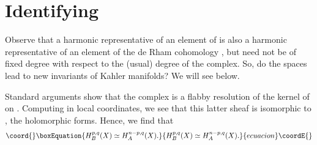 \documentclass[a4paper,11pt]{amsart}
\begin{document}
\section{Identifying \coordHE{}}
Observe that a harmonic representative of an element of \coordHE{} is also a 
harmonic representative of an element of the de Rham cohomology \coordHE{}, 
but need not be of fixed degree with respect to the (usual) degree of the 
\coordHE{} complex. So, do the spaces \coordHE{} lead to new invariants of Kahler 
manifolds? We will see below.

Standard arguments show that the complex \coordHE{} is a flabby 
resolution of the kernel of \coordHE{} on \coordHE{}. Computing in local coordinates,
we see that this latter sheaf is isomorphic to \coordHE{}, the holomorphic
 \coordHE{} forms. Hence, we find that 
\begin{equation}\coord{}\boxEquation{\label{mirror1}
H^{p,q}_B(X) \simeq H^{n-p,q}_A(X).
}{H^{p,q}_B(X) \simeq H^{n-p,q}_A(X).
}{ecuacion}\coordE{}\end{equation}
\end{document}

